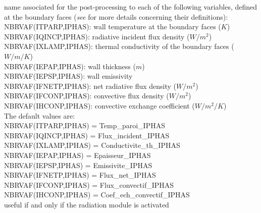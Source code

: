 {name associated for the post-processing to each of the following variables,
defined at the boundary faces ({\it see}
\cite{Douce02} for more details concerning their definitions):\\
\hspace*{1.3cm} NBRVAF(ITPARP,IPHAS): wall temperature at the boundary
faces ($K$)\\ 
\hspace*{1.3cm} NBRVAF(IQINCP,IPHAS): radiative incident flux density
($W/m^2$)\\ 
\hspace*{1.3cm} NBRVAF(IXLAMP,IPHAS): thermal conductivity of the
boundary faces ($W/m/K$)\\
\hspace*{1.3cm} NBRVAF(IEPAP,IPHAS): wall thickness ($m$)\\
\hspace*{1.3cm} NBRVAF(IEPSP,IPHAS): wall emissivity \\
\hspace*{1.3cm} NBRVAF(IFNETP,IPHAS): net radiative flux density ($W/m^2$)\\
\hspace*{1.3cm} NBRVAF(IFCONP,IPHAS): convective flux density ($W/m^2$)\\
\hspace*{1.3cm} NBRVAF(IHCONP,IPHAS): convective exchange coefficient
($W/m^2/K$)\\ 
The default values are: \\
\hspace*{1.3cm} NBRVAF(ITPARP,IPHAS) = Temp\_paroi\_IPHAS \\
\hspace*{1.3cm} NBRVAF(IQINCP,IPHAS) = Flux\_incident\_IPHAS \\
\hspace*{1.3cm} NBRVAF(IXLAMP,IPHAS) = Conductivite\_th\_IPHAS \\
\hspace*{1.3cm} NBRVAF(IEPAP,IPHAS)  = Epaisseur\_IPHAS \\
\hspace*{1.3cm} NBRVAF(IEPSP,IPHAS)  = Emissivite\_IPHAS \\
\hspace*{1.3cm} NBRVAF(IFNETP,IPHAS) = Flux\_net\_IPHAS \\
\hspace*{1.3cm} NBRVAF(IFCONP,IPHAS) = Flux\_convectif\_IPHAS \\
\hspace*{1.3cm} NBRVAF(IHCONP,IPHAS) = Coef\_ech\_convectif\_IPHAS \\
useful if and only if the radiation module is activated}

